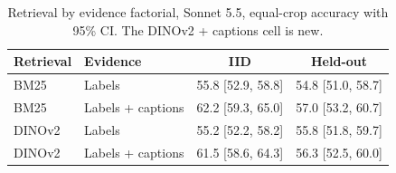 \begin{table}[t]
\centering\small
\caption{Retrieval by evidence factorial, Sonnet 5.5, equal-crop accuracy with 95\% CI. The DINOv2 + captions cell is new.}
\label{tab:table_B_factorial}
\begin{tabular}{llcc}
\toprule
Retrieval & Evidence & IID & Held-out \\
\midrule
BM25 & Labels & 55.8 [52.9, 58.8] & 54.8 [51.0, 58.7] \\
BM25 & Labels + captions & \cellcolor{bestgreen}62.2 [59.3, 65.0] & \cellcolor{bestgreen}57.0 [53.2, 60.7] \\
DINOv2 & Labels & 55.2 [52.2, 58.2] & 55.8 [51.8, 59.7] \\
DINOv2 & Labels + captions & 61.5 [58.6, 64.3] & 56.3 [52.5, 60.0] \\
\bottomrule
\end{tabular}
\end{table}
